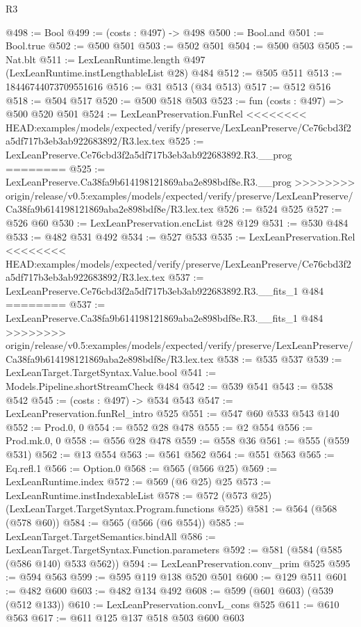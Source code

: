 \begin{lexlean}{R3}
\begin{coremodule}
{{{{{{{{{{{{{{{{{{{{{{{{{{@498 := Bool
@499 := (costs : @497) -> @498
@500 := Bool.and
@501 := Bool.true
@502 := @500 @501
@503 := @502 @501
@504 := @500 @503
@505 := Nat.blt
@511 := LexLeanRuntime.length @497 (LexLeanRuntime.instLengthableList @28) @484
@512 := @505 @511
@513 := 18446744073709551616
@516 := @31 @513 (@34 @513)
@517 := @512 @516
@518 := @504 @517
@520 := @500 @518 @503
@523 := fun (costs : @497) => @500 @520 @501
@524 := LexLeanPreservation.FunRel
<<<<<<<< HEAD:examples/models/expected/verify/preserve/LexLeanPreserve/Ce76cbd3f2a5df717b3eb3ab922683892/R3.lex.tex
@525 := LexLeanPreserve.Ce76cbd3f2a5df717b3eb3ab922683892.R3.__prog
========
@525 := LexLeanPreserve.Ca38fa9b614198121869aba2e898bdf8e.R3.__prog
>>>>>>>> origin/release/v0.5:examples/models/expected/verify/preserve/LexLeanPreserve/Ca38fa9b614198121869aba2e898bdf8e/R3.lex.tex
@526 := @524 @525
@527 := @526 @60
@530 := LexLeanPreservation.encList @28 @129
@531 := @530 @484
@533 := @482 @531 @492
@534 := @527 @533
@535 := LexLeanPreservation.Rel
<<<<<<<< HEAD:examples/models/expected/verify/preserve/LexLeanPreserve/Ce76cbd3f2a5df717b3eb3ab922683892/R3.lex.tex
@537 := LexLeanPreserve.Ce76cbd3f2a5df717b3eb3ab922683892.R3.__fits_1 @484
========
@537 := LexLeanPreserve.Ca38fa9b614198121869aba2e898bdf8e.R3.__fits_1 @484
>>>>>>>> origin/release/v0.5:examples/models/expected/verify/preserve/LexLeanPreserve/Ca38fa9b614198121869aba2e898bdf8e/R3.lex.tex
@538 := @535 @537
@539 := LexLeanTarget.TargetSyntax.Value.bool
@541 := Models.Pipeline.shortStreamCheck @484
@542 := @539 @541
@543 := @538 @542
@545 := (costs : @497) -> @534 @543
@547 := LexLeanPreservation.funRel_intro @525
@551 := @547 @60 @533 @543 @140
@552 := Prod.{0, 0}
@554 := @552 @28 @478
@555 := @2 @554
@556 := Prod.mk.{0, 0}
@558 := @556 @28 @478
@559 := @558 @36
@561 := @555 (@559 @531)
@562 := @13 @554
@563 := @561 @562
@564 := @551 @563
@565 := Eq.refl.{1}
@566 := Option.{0}
@568 := @565 (@566 @25)
@569 := LexLeanRuntime.index
@572 := @569 (@6 @25) @25
@573 := LexLeanRuntime.instIndexableList
@578 := @572 (@573 @25) (LexLeanTarget.TargetSyntax.Program.functions @525)
@581 := @564 (@568 (@578 @60))
@584 := @565 (@566 (@6 @554))
@585 := LexLeanTarget.TargetSemantics.bindAll
@586 := LexLeanTarget.TargetSyntax.Function.parameters
@592 := @581 (@584 (@585 (@586 @140) @533 @562))
@594 := LexLeanPreservation.conv_prim @525
@595 := @594 @563
@599 := @595 @119 @138 @520 @501
@600 := @129 @511
@601 := @482 @600
@603 := @482 @134 @492
@608 := @599 (@601 @603) (@539 (@512 @133))
@610 := LexLeanPreservation.convL_cons @525
@611 := @610 @563
@617 := @611 @125 @137 @518 @503 @600 @603
}}}}}}}}}}}}}}}}}}}}}}}}}}
\end{coremodule}
\end{lexlean}
